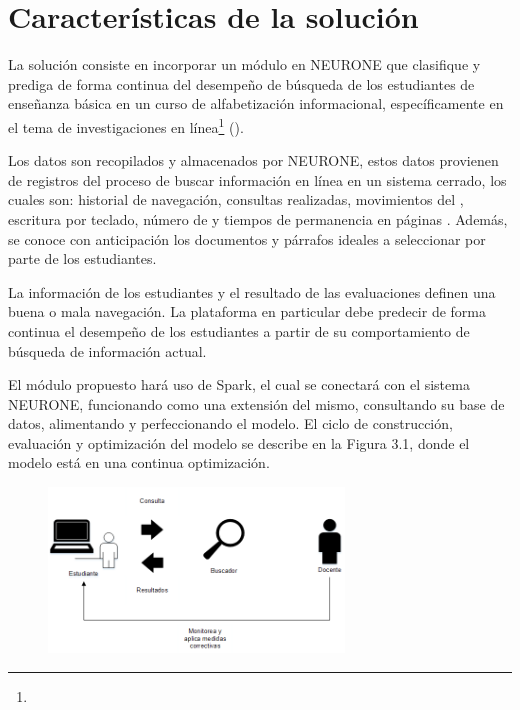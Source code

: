 \section{Características de la solución}
\label{sec:caracteristicas-solucion}
La solución consiste en incorporar un módulo en NEURONE \parencite{gonzalez2017neurone} que clasifique y prediga de forma continua del desempeño de búsqueda de los estudiantes de enseñanza básica en un curso de alfabetización informacional, específicamente en el tema de investigaciones en línea\footnote{\traduccionlibre} (). 

Los datos son recopilados y almacenados por NEURONE, estos datos provienen de registros del proceso de buscar información en línea en un sistema cerrado, los cuales son: historial de navegación, consultas realizadas, movimientos del , escritura por teclado, número de  y tiempos de permanencia en páginas . Además, se conoce con anticipación los documentos y párrafos ideales a seleccionar por parte de los estudiantes.

La información de los estudiantes y el resultado de las evaluaciones definen una buena o mala navegación. La plataforma en particular debe predecir de forma continua el desempeño de los estudiantes a partir de su comportamiento de búsqueda de información actual.

El módulo propuesto hará uso de Spark, el cual se conectará con el sistema NEURONE, funcionando como una extensión del mismo, consultando su base de datos, alimentando y perfeccionando el modelo. El ciclo de construcción, evaluación y optimización del modelo se describe en la Figura 3.1, donde el modelo está en una continua optimización.


\begin{figure}[htb]
	\centering
	\includegraphics[width=0.7\textwidth]{03_GraphicFiles/p07.png}
	\label{fig:docente_estudiante}
\end{figure}

